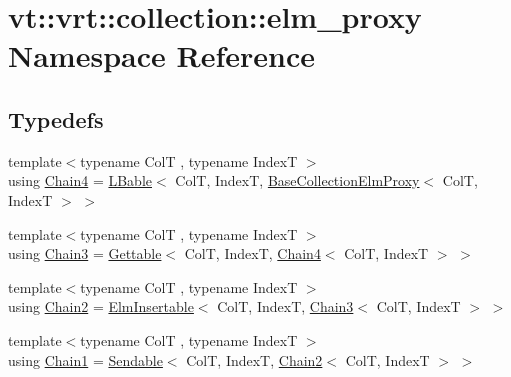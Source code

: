 \hypertarget{namespacevt_1_1vrt_1_1collection_1_1elm__proxy}{}\section{vt\+:\+:vrt\+:\+:collection\+:\+:elm\+\_\+proxy Namespace Reference}
\label{namespacevt_1_1vrt_1_1collection_1_1elm__proxy}
\subsection*{Typedefs}
\begin{DoxyCompactItemize}
\item 
{\footnotesize template$<$typename ColT , typename IndexT $>$ }\\using \hyperlink{namespacevt_1_1vrt_1_1collection_1_1elm__proxy_ad02b3ccfc141a64eb83d8481f89a91c5}{Chain4} = \hyperlink{structvt_1_1vrt_1_1collection_1_1_l_bable}{L\+Bable}$<$ ColT, IndexT, \hyperlink{structvt_1_1vrt_1_1collection_1_1_base_collection_elm_proxy}{Base\+Collection\+Elm\+Proxy}$<$ ColT, IndexT $>$ $>$
\item 
{\footnotesize template$<$typename ColT , typename IndexT $>$ }\\using \hyperlink{namespacevt_1_1vrt_1_1collection_1_1elm__proxy_a8db2caa0e0d4bb8dafc382c8953b2574}{Chain3} = \hyperlink{structvt_1_1vrt_1_1collection_1_1_gettable}{Gettable}$<$ ColT, IndexT, \hyperlink{namespacevt_1_1vrt_1_1collection_1_1elm__proxy_ad02b3ccfc141a64eb83d8481f89a91c5}{Chain4}$<$ ColT, IndexT $>$ $>$
\item 
{\footnotesize template$<$typename ColT , typename IndexT $>$ }\\using \hyperlink{namespacevt_1_1vrt_1_1collection_1_1elm__proxy_ad78450181b0704fe0969ae1d0f6cb4c7}{Chain2} = \hyperlink{structvt_1_1vrt_1_1collection_1_1_elm_insertable}{Elm\+Insertable}$<$ ColT, IndexT, \hyperlink{namespacevt_1_1vrt_1_1collection_1_1elm__proxy_a8db2caa0e0d4bb8dafc382c8953b2574}{Chain3}$<$ ColT, IndexT $>$ $>$
\item 
{\footnotesize template$<$typename ColT , typename IndexT $>$ }\\using \hyperlink{namespacevt_1_1vrt_1_1collection_1_1elm__proxy_af1c695e3f939aca249111179a57b24bf}{Chain1} = \hyperlink{structvt_1_1vrt_1_1collection_1_1_sendable}{Sendable}$<$ ColT, IndexT, \hyperlink{namespacevt_1_1vrt_1_1collection_1_1elm__proxy_ad78450181b0704fe0969ae1d0f6cb4c7}{Chain2}$<$ ColT, IndexT $>$ $>$
\end{DoxyCompactItemize}


